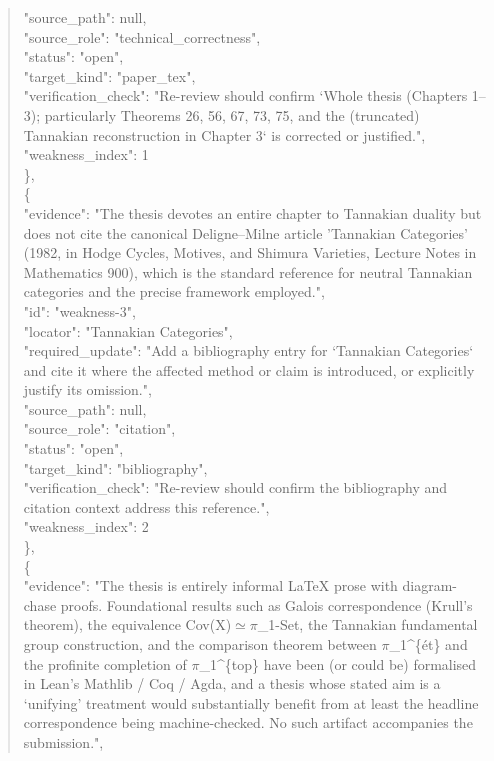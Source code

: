 \documentclass[11pt]{article}
\begin{document}
\begin{quote}
      "source\_path": null,\\
      "source\_role": "technical\_correctness",\\
      "status": "open",\\
      "target\_kind": "paper\_tex",\\
      "verification\_check": "Re-review should confirm `Whole thesis (Chapters 1--3); particularly Theorems 26, 56, 67, 73, 75, and the (truncated) Tannakian reconstruction in Chapter 3` is corrected or justified.",\\
      "weakness\_index": 1\\
    \},\\
    \{\\
      "evidence": "The thesis devotes an entire chapter to Tannakian duality but does not cite the canonical Deligne--Milne article 'Tannakian Categories' (1982, in Hodge Cycles, Motives, and Shimura Varieties, Lecture Notes in Mathematics 900), which is the standard reference for neutral Tannakian categories and the precise framework employed.",\\
      "id": "weakness-3",\\
      "locator": "Tannakian Categories",\\
      "required\_update": "Add a bibliography entry for `Tannakian Categories` and cite it where the affected method or claim is introduced, or explicitly justify its omission.",\\
      "source\_path": null,\\
      "source\_role": "citation",\\
      "status": "open",\\
      "target\_kind": "bibliography",\\
      "verification\_check": "Re-review should confirm the bibliography and citation context address this reference.",\\
      "weakness\_index": 2\\
    \},\\
    \{\\
      "evidence": "The thesis is entirely informal LaTeX prose with diagram-chase proofs. Foundational results such as Galois correspondence (Krull’s theorem), the equivalence Cov(X)\ensuremath{\simeq}\ensuremath{\pi}\_1-Set, the Tannakian fundamental group construction, and the comparison theorem between \ensuremath{\pi}\_1\^{}\{ét\} and the profinite completion of \ensuremath{\pi}\_1\^{}\{top\} have been (or could be) formalised in Lean’s Mathlib / Coq / Agda, and a thesis whose stated aim is a ‘unifying’ treatment would substantially benefit from at least the headline correspondence being machine-checked. No such artifact accompanies the submission.",\\

\end{quote}
\end{document}
